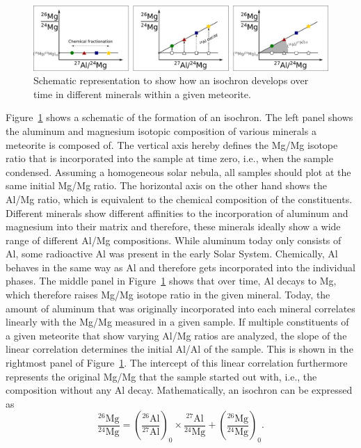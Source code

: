 \begin{figure}[tb]
    \centering
    \includegraphics[width=\textwidth]{graphics/solar_system_slrs/al26_isochron}
    \caption{Schematic representation to show how an isochron develops over time in different minerals within a given meteorite.}
    \label{fig:solar_system_slrs:al26_isochron}
\end{figure}
Figure~\ref{fig:solar_system_slrs:al26_isochron} shows a schematic of the formation of an isochron. The left panel shows the aluminum and magnesium isotopic composition of various minerals a meteorite is composed of. The vertical axis hereby defines the Mg/Mg isotope ratio that is incorporated into the sample at time zero, i.e., when the sample condensed. Assuming a homogeneous solar nebula, all samples should plot at the same initial Mg/Mg ratio. The horizontal axis on the other hand shows the Al/Mg ratio, which is equivalent to the chemical composition of the constituents. Different minerals show different affinities to the incorporation of aluminum and magnesium into their matrix and therefore, these minerals ideally show a wide range of different Al/Mg compositions. While aluminum today only consists of Al, some radioactive Al was present in the early Solar System. Chemically, Al behaves in the same way as Al and therefore gets incorporated into the individual phases. The middle panel in Figure~\ref{fig:solar_system_slrs:al26_isochron} shows that over time, Al decays to Mg, which therefore raises Mg/Mg isotope ratio in the given mineral. Today, the amount of aluminum that was originally incorporated into each mineral correlates linearly with the Mg/Mg measured in a given sample. If multiple constituents of a given meteorite that show varying Al/Mg ratios are analyzed, the slope of the linear correlation determines the initial Al/Al of the sample. This is shown in the rightmost panel of Figure~\ref{fig:solar_system_slrs:al26_isochron}. The intercept of this linear correlation furthermore represents the original Mg/Mg that the sample started out with, i.e., the composition without any Al decay. Mathematically, an isochron can be expressed as
\begin{equation}
    \frac{^{26}\mathrm{Mg}}{^{24}\mathrm{Mg}} = \left(\frac{^{26}\mathrm{Al}}{^{27}\mathrm{Al}}\right)_0 \times \frac{^{27}\mathrm{Al}}{^{24}\mathrm{Mg}} + \left(\frac{^{26}\mathrm{Mg}}{^{24}\mathrm{Mg}}\right)_0.
\end{equation}

